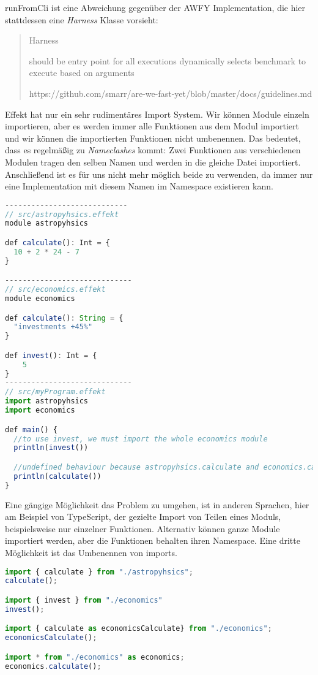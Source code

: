 runFromCli ist eine Abweichung gegenüber der AWFY Implementation, die hier stattdessen eine \textit{Harness} Klasse vorsieht:
\begin{quote}
    Harness

    should be entry point for all executions
    dynamically selects benchmark to execute based on arguments

    https://github.com/smarr/are-we-fast-yet/blob/master/docs/guidelines.md
\end{quote}
Effekt hat nur ein sehr rudimentäres Import System. Wir können Module einzeln importieren, aber es werden immer alle Funktionen aus dem Modul importiert und wir können die importierten Funktionen nicht umbenennen.
Das bedeutet, dass es regelmäßig zu \textit{Nameclashes} kommt: Zwei Funktionen aus verschiedenen Modulen tragen den selben Namen und werden in die gleiche Datei importiert. Anschließend ist es für uns nicht mehr möglich beide zu verwenden, da immer nur eine Implementation mit diesem Namen im Namespace existieren kann.
\begin{lstlisting}[language=javascript]
----------------------------
// src/astropyhsics.effekt
module astropyhsics

def calculate(): Int = {
  10 + 2 * 24 - 7
}

-----------------------------
// src/economics.effekt
module economics

def calculate(): String = {
  "investments +45%"
}

def invest(): Int = {
    5
}
-----------------------------
// src/myProgram.effekt
import astropyhsics
import economics

def main() {
  //to use invest, we must import the whole economics module
  println(invest())

  //undefined behaviour because astropyhsics.calculate and economics.calculate clash
  println(calculate())
}
\end{lstlisting}

Eine gängige Möglichkeit das Problem zu umgehen, ist in anderen Sprachen, hier am Beispiel von TypeScript, der gezielte Import von Teilen eines Moduls, beispielsweise nur einzelner Funktionen. Alternativ können ganze Module importiert werden, aber die Funktionen behalten ihren Namespace.
Eine dritte Möglichkeit ist das Umbenennen von imports.

\begin{lstlisting}[language=javascript]
import { calculate } from "./astropyhsics";
calculate();

import { invest } from "./economics"
invest();

import { calculate as economicsCalculate} from "./economics";
economicsCalculate();

import * from "./economics" as economics;
economics.calculate();
\end{lstlisting}

